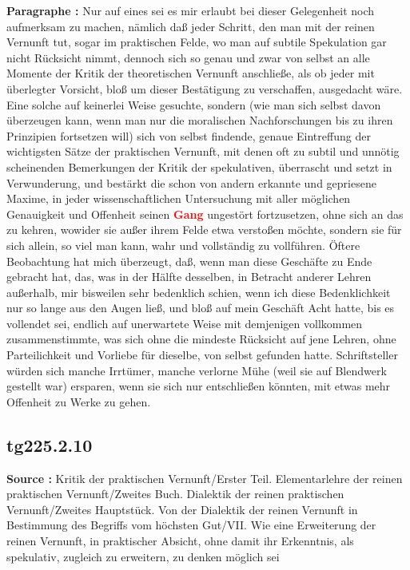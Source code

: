 \documentclass[a4paper,12pt,twoside]{book}
\newcommand{\match}[1]{\textcolor{red}{\textbf{#1}}}
\begin{document}
	\textbf{Paragraphe : }Nur auf eines sei es mir erlaubt bei dieser Gelegenheit noch aufmerksam zu machen, nämlich daß jeder Schritt, den man mit der reinen Vernunft tut, sogar im praktischen Felde, wo man auf subtile Spekulation gar nicht Rücksicht nimmt, dennoch sich so genau und zwar von selbst an alle Momente der Kritik der theoretischen Vernunft anschließe, als ob jeder mit überlegter Vorsicht, bloß um dieser Bestätigung zu verschaffen, ausgedacht wäre. Eine solche auf keinerlei Weise gesuchte, sondern (wie man sich selbst davon überzeugen kann, wenn man nur die moralischen Nachforschungen bis zu ihren Prinzipien fortsetzen will) sich von selbst findende, genaue Eintreffung der wichtigsten Sätze der praktischen Vernunft, mit denen oft zu subtil und unnötig scheinenden Bemerkungen der Kritik der spekulativen, überrascht und setzt in Verwunderung, und bestärkt die schon von andern erkannte und gepriesene Maxime, in jeder wissenschaftlichen Untersuchung mit aller möglichen Genauigkeit und Offenheit seinen \match{Gang} ungestört fortzusetzen,  ohne sich an das zu kehren, wowider sie außer ihrem Felde etwa verstoßen möchte, sondern sie für sich allein, so viel man kann, wahr und vollständig zu vollführen. Öftere Beobachtung hat mich überzeugt, daß, wenn man diese Geschäfte zu Ende gebracht hat, das, was in der Hälfte desselben, in Betracht anderer Lehren außerhalb, mir bisweilen sehr bedenklich schien, wenn ich diese Bedenklichkeit nur so lange aus den Augen ließ, und bloß auf mein Geschäft Acht hatte, bis es vollendet sei, endlich auf unerwartete Weise mit demjenigen vollkommen zusammenstimmte, was sich ohne die mindeste Rücksicht auf jene Lehren, ohne Parteilichkeit und Vorliebe für dieselbe, von selbst gefunden hatte. Schriftsteller würden sich manche Irrtümer, manche verlorne Mühe (weil sie auf Blendwerk gestellt war) ersparen, wenn sie sich nur entschließen könnten, mit etwas mehr Offenheit zu Werke zu gehen. 
	
	\subsection*{tg225.2.10} 
	\textbf{Source : }Kritik der praktischen Vernunft/Erster Teil. Elementarlehre der reinen praktischen Vernunft/Zweites Buch. Dialektik der reinen praktischen Vernunft/Zweites Hauptstück. Von der Dialektik der reinen Vernunft in Bestimmung des Begriffs vom höchsten Gut/VII. Wie eine Erweiterung der reinen Vernunft, in praktischer Absicht, ohne damit ihr Erkenntnis, als spekulativ, zugleich zu erweitern, zu denken möglich sei\\  
	
\end{document}
